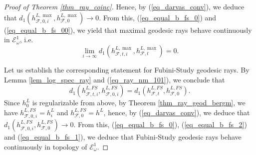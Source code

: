 \documentclass[12pt]{article}
\numberwithin{equation}{section}
\theoremstyle{theorem}
\theoremstyle{definition}
\theoremstyle{remark}
\begin{document}
\begin{proof}[Proof of Theorem \ref{thm_ray_coinc}]
		Hence, by (\ref{eq_darvas_conv}), we deduce that $d_1(h^{L, \max}_{\mathcal{F}, 0, i}, h^{L, \max}_{\mathcal{F}, 0}) \to 0$.
		From this, (\ref{eq_equal_b_fs_0}) and (\ref{eq_equal_b_fs_00}), we yield that maximal geodesic rays behave continuously in $\mathcal{E}_{\omega}^1$, i.e.
		\begin{equation}\label{eq_equal_b_fs_2}
			\lim_{i \to \infty} d_1(h^{L, \max}_{\mathcal{F}, t, i}, h^{L, \max}_{\mathcal{F}, t})
			=
			0.
		\end{equation}
		\par Let us establish the corresponding statement for Fubini-Study geodesic rays.
		By Lemma \ref{lem_log_spec_ray} and (\ref{eq_ray_nm_101}), we conclude that
		\begin{equation}\label{eq_equal_b_fs_1}
			d_1(h^{L, FS}_{\mathcal{F}, t, i}, h^{L, FS}_{\mathcal{F}, 0, i})
			=
			d_1(h^{L, FS}_{\mathcal{F}, t}, h^{L, FS}_{\mathcal{F}, 0}).
		\end{equation}
		Since $h^L_0$ is regularizable from above, by Theorem \ref{thm_ray_geod_bergm}, we have $h^{L, FS}_{\mathcal{F}, 0, i} = h^L_i$ and $h^{L, FS}_{\mathcal{F}, 0} = h^L$, hence, by (\ref{eq_darvas_conv}), we deduce that $d_1(h^{L, FS}_{\mathcal{F}, 0, i}, h^{L, FS}_{\mathcal{F}, 0}) \to 0$.
		From this, (\ref{eq_equal_b_fs_0}), (\ref{eq_equal_b_fs_2}) and (\ref{eq_equal_b_fs_1}), we deduce that Fubini-Study geodesic rays behave continuously in topology of $\mathcal{E}_{\omega}^1$.
	\end{proof}

	
\end{document}
